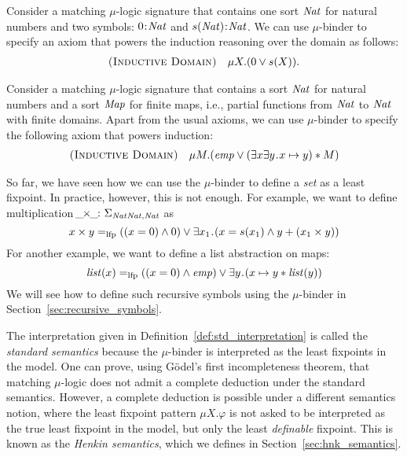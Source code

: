 \documentclass{amsart}
\begin{document}
\begin{example}
Consider a matching $\mu$-logic signature that contains
one sort $\mathit{Nat}$ for natural numbers and two symbols:
$0 \mathbin{\!:\!} \mathit{Nat}$ and $s(\mathit{Nat}) \mathbin{\!:\!} \mathit{Nat}$.
We can use $\mu$-binder to specify an axiom that powers the induction reasoning
over the domain as follows:
\begin{align*}
\textnormal{\textsc{(Inductive Domain)}} \quad
\mu X . (0 \vee s(X)).
\end{align*}
\end{example}

\begin{example}
Consider a matching $\mu$-logic signature that contains
a sort $\mathit{Nat}$ for natural numbers and a sort $\mathit{Map}$ for finite maps,
i.e., partial functions from $\mathit{Nat}$ to $\mathit{Nat}$ with finite domains. 
Apart from the usual axioms, we can use $\mu$-binder to specify
the following axiom that powers induction:
\begin{align*}
\textnormal{\textsc{(Inductive Domain)}} \quad
\mu M . (\mathit{emp} \vee (\exists x \exists y \mathbin{\!.\!} x \mapsto y) \mathbin{*} M)
\end{align*}
\end{example}

So far, we have seen how we can use the $\mu$-binder to
define a \emph{set} as a least fixpoint. 
In practice, however, this is not enough. 
For example, we want to define multiplication 
${\!\_\!} \! \times \! {\!\_\!} \colon \Sigma_{\mathit{Nat}\mathit{Nat},\mathit{Nat}}$ as
$$
x \times y =_{\mathrm{lfp}} ((x = 0) \wedge 0) 
\vee \exists x_1 \mathbin{\!.\!} (x = s(x_1) \wedge y + (x_1 \times y))
$$
For another example, we want to define a list abstraction on maps:
$$
\mathit{list}(x) =_{\mathrm{lfp}} ((x = 0) \wedge \mathit{emp}) \vee \exists y \mathbin{\!.\!} (x \mapsto y \mathbin{*} \mathit{list}(y))
$$
We will see how to define such recursive symbols using the $\mu$-binder
in Section~\ref{sec:recursive_symbols}.

The interpretation given in Definition~\ref{def:std_interpretation}
is called the \emph{standard semantics} because the $\mu$-binder
is interpreted as the least fixpoints in the model.
One can prove, using G\"odel's first incompleteness theorem,
that matching $\mu$-logic 
does not admit a complete deduction under the standard semantics.
However, a complete deduction is possible under a different semantics notion,
where the least fixpoint pattern 
$\mu X . \varphi$ 
is not asked to be interpreted as
the true least fixpoint in the model, but only the least \emph{definable} fixpoint.
This is known as the \emph{Henkin semantics}, which we defines in
Section~\ref{sec:hnk_semantics}.
\end{document}
